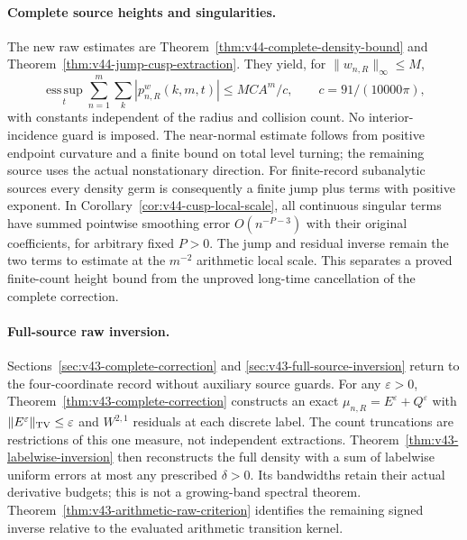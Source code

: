 \documentclass[11pt,reqno]{amsart}
\numberwithin{equation}{section}
\theoremstyle{definition}\newtheorem{definition}[theorem]{Definition}
\theoremstyle{remark}\newtheorem{remark}[theorem]{Remark}
\begin{document}
\paragraph{Complete source heights and singularities.}
The new raw estimates are Theorem~\ref{thm:v44-complete-density-bound}
and Theorem~\ref{thm:v44-jump-cusp-extraction}. They yield, for
$\|w_{n,R}\|_\infty\le M$,
\[
 \operatorname*{ess\,sup}_{t}\sum_{n=1}^m\sum_k
       |p^w_{n,R}(k,m,t)|\le MCA^m/c,
 \qquad c=91/(10000\pi),
\]
with constants independent of the radius and collision count. No
interior-incidence guard is imposed. The near-normal estimate follows
from positive endpoint curvature and a finite bound on total level
turning; the remaining source uses the actual nonstationary direction.
For finite-record subanalytic sources every density germ is consequently
a finite jump plus terms with positive exponent. In
Corollary~\ref{cor:v44-cusp-local-scale}, all continuous singular terms
have summed pointwise smoothing error $O(n^{-P-3})$ with their original
coefficients, for arbitrary fixed $P>0$. The jump and residual inverse
remain the two terms to estimate at the $m^{-2}$ arithmetic local scale.
This separates a proved finite-count height bound from the unproved
long-time cancellation of the complete correction.

\paragraph{Full-source raw inversion.}
Sections~\ref{sec:v43-complete-correction} and
\ref{sec:v43-full-source-inversion} return to the four-coordinate
record without auxiliary source guards. For any $\varepsilon>0$,
Theorem~\ref{thm:v43-complete-correction} constructs an exact
$\mu_{n,R}=E^\varepsilon+Q^\varepsilon$ with
$\|E^\varepsilon\|_{\operatorname{TV}}\le\varepsilon$ and $W^{2,1}$ residuals
at each discrete label. The count truncations are restrictions of this
one measure, not independent extractions. Theorem~\ref{thm:v43-labelwise-inversion}
then reconstructs the full density with a sum of labelwise uniform
errors at most any prescribed $\delta>0$. Its bandwidths retain their
actual derivative budgets; this is not a growing-band spectral theorem.
Theorem~\ref{thm:v43-arithmetic-raw-criterion} identifies the remaining
signed inverse relative to the evaluated arithmetic transition kernel.
\end{document}
